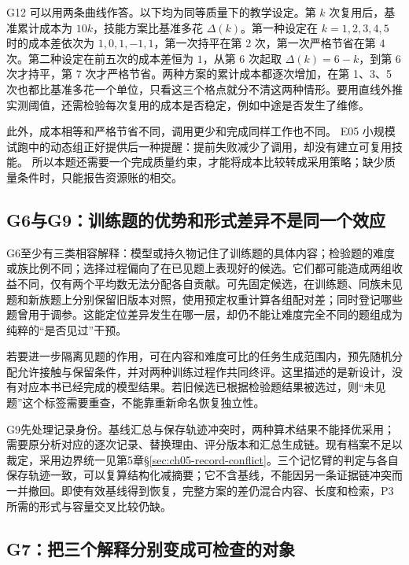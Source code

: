 \leavevmode{}\label{sol:g12}G12 可以用两条曲线作答。以下均为同等质量下的教学设定。第 $k$ 次复用后，基准累计成本为 $10k$，技能方案比基准多花 $\Delta(k)$。第一种设定在 $k=1,2,3,4,5$ 时的成本差依次为 $1,0,1,-1,1$，第一次持平在第 2 次，第一次严格节省在第 4 次。第二种设定在前五次的成本差恒为 $1$，从第 6 次起取 $\Delta(k)=6-k$，到第 6 次才持平，第 7 次才严格节省。两种方案的累计成本都逐次增加，在第 1、3、5 次也都比基准多花一个单位，只看这三个格点就分不清这两种情形。要用直线外推实测阈值，还需检验每次复用的成本是否稳定，例如中途是否发生了维修。

此外，成本相等和严格节省不同，调用更少和完成同样工作也不同。
E05 小规模试跑中的动态组正好提供后一种提醒：提前失败减少了调用，却没有建立可复用技能。
所以本题还需要一个完成质量约束，才能将成本比较转成采用策略；缺少质量条件时，只能报告资源账的相交。



\subsection{G6与G9：训练题的优势和形式差异不是同一个效应}\label{sol:g06}

G6至少有三类相容解释：模型或持久物记住了训练题的具体内容；检验题的难度或族比例不同；选择过程偏向了在已见题上表现好的候选。它们都可能造成两组收益不同，仅有两个平均数无法分配各自贡献。可先固定候选，在训练题、同族未见题和新族题上分别保留旧版本对照，使用预定权重计算各组配对差；同时登记哪些题曾用于调参。这能定位差异发生在哪一层，却仍不能让难度完全不同的题组成为纯粹的“是否见过”干预。

若要进一步隔离见题的作用，可在内容和难度可比的任务生成范围内，预先随机分配允许接触与保留条件，并对两种训练过程作共同终评。这里描述的是新设计，没有对应本书已经完成的模型结果。若旧候选已根据检验题结果被选过，则“未见题”这个标签需要重查，不能靠重新命名恢复独立性。

\leavevmode{}\label{sol:g09}G9先处理记录身份。基线汇总与保存轨迹冲突时，两种算术结果不能择优采用；需要原分析对应的逐次记录、替换理由、评分版本和汇总生成链。现有档案不足以裁定，采用边界统一见第5章\S\ref{sec:ch05-record-conflict}。三个记忆臂的判定与各自保存轨迹一致，可以复算结构化减摘要；它不含基线，不能因另一条证据链冲突而一并撤回。即使有效基线得到恢复，完整方案的差仍混合内容、长度和检索，P3所需的形式与容量交叉比较仍缺。

\subsection{G7：把三个解释分别变成可检查的对象}\label{sol:g07}

